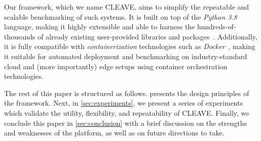 Our framework, which we name \ac{CLEAVE}, aims to simplify the repeatable and scalable benchmarking of such systems. 
It is built on top of the \emph{Python 3.8}~\cite{Python3.8} language, making it highly extensible and able to harness the hundreds-of-thousands of already existing user-provided libraries and packages~\cite{pypi}.
Additionally, it is fully compatible with \emph{containerization} technologies such as \emph{Docker}~\cite{merkel2014docker}, making it suitable for automated deployment and benchmarking on industry-standard cloud and (more importantly) edge setups using container orchestration technologies.

The rest of this paper is structured as follows.
 presents the design principles of the framework.
Next, in \cref{sec:experiments}, we present a series of experiments which validate the utility, flexibility, and repeatability of \ac{CLEAVE}.
Finally, we conclude this paper in \cref{sec:conclusion} with a brief discussion on the strengths and weaknesses of the platform, as well as on future directions to take.